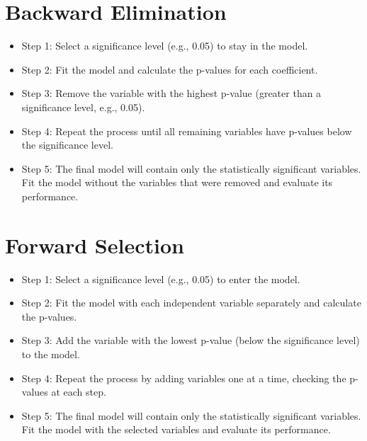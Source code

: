 \documentclass[conference]{IEEEtran}
\begin{document}
\section*{Backward Elimination}
\begin{itemize}
    \item Step 1: Select a significance level (e.g., 0.05) to stay in the model.
    \item Step 2: Fit the model and calculate the p-values for each coefficient.
    \item Step 3: Remove the variable with the highest p-value (greater than a significance level, e.g., 0.05).
    \item Step 4: Repeat the process until all remaining variables have p-values below the significance level.
    \item Step 5: The final model will contain only the statistically significant variables. Fit the model without the variables that were removed and evaluate its performance.
\end{itemize}

\section*{Forward Selection}
\begin{itemize}
    \item Step 1: Select a significance level (e.g., 0.05) to enter the model.
    \item Step 2: Fit the model with each independent variable separately and calculate the p-values.
    \item Step 3: Add the variable with the lowest p-value (below the significance level) to the model.
    \item Step 4: Repeat the process by adding variables one at a time, checking the p-values at each step.
    \item Step 5: The final model will contain only the statistically significant variables. Fit the model with the selected variables and evaluate its performance.
\end{itemize}
\end{document}

